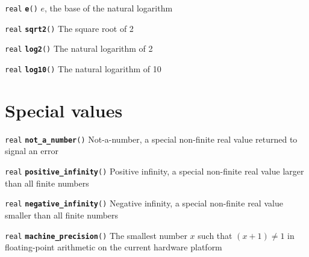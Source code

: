 \documentclass[
  10pt,
]{book}
\begin{document}

\texttt{real} \textbf{\texttt{e}}\texttt{()}\newline
\(e\), the base of the natural logarithm


\texttt{real} \textbf{\texttt{sqrt2}}\texttt{()}\newline
The square root of 2


\texttt{real} \textbf{\texttt{log2}}\texttt{()}\newline
The natural logarithm of 2


\texttt{real} \textbf{\texttt{log10}}\texttt{()}\newline
The natural logarithm of 10

\hypertarget{special-values}{%
\section{Special values}\label{special-values}}


\texttt{real} \textbf{\texttt{not\_a\_number}}\texttt{()}\newline
Not-a-number, a special non-finite real value returned to signal an
error


\texttt{real} \textbf{\texttt{positive\_infinity}}\texttt{()}\newline
Positive infinity, a special non-finite real value larger than all
finite numbers


\texttt{real} \textbf{\texttt{negative\_infinity}}\texttt{()}\newline
Negative infinity, a special non-finite real value smaller than all
finite numbers


\texttt{real} \textbf{\texttt{machine\_precision}}\texttt{()}\newline
The smallest number \(x\) such that \((x + 1) \neq 1\) in floating-point
arithmetic on the current hardware platform
\end{document}
